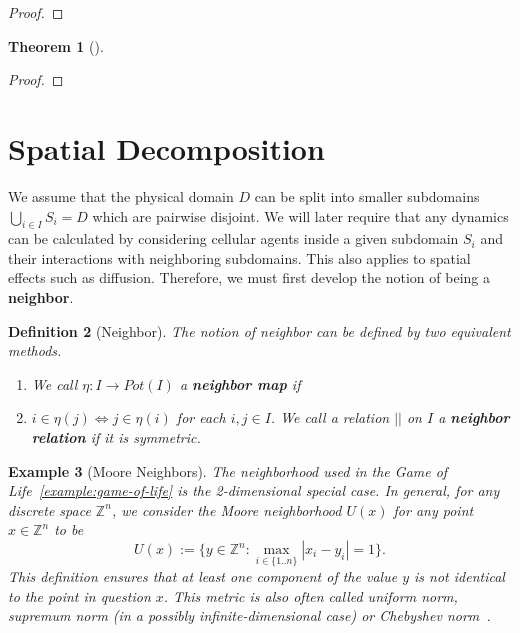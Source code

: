 \documentclass{article}
\newtheorem{definition}{Definition}[section]
\newtheorem{example}[definition]{Example}
\newtheorem{theorem}[definition]{Theorem}
\begin{document}
\begin{proof}
\end{proof}

\begin{theorem}[]
\end{theorem}
\begin{proof}
\end{proof}

\section{Spatial Decomposition}
\label{section:spatial-decomposition}
We assume that the physical domain $D$ can be split into smaller subdomains
$\bigcup_{i\in I}S_i=D$ which are pairwise disjoint.
We will later require that any dynamics can be calculated by considering cellular agents inside a
given subdomain $S_i$ and their interactions with neighboring subdomains.
This also applies to spatial effects such as diffusion.
Therefore, we must first develop the notion of being a \textbf{neighbor}.

\begin{definition}[Neighbor]
    The notion of neighbor can be defined by two equivalent methods.
    \begin{enumerate}
        \item We call $\eta:I\rightarrow Pot(I)$ a \textbf{neighbor map} if
        \item $i\in\eta(j) \Leftrightarrow j\in\eta(i)$ for each $i,j\in I$.
            We call a relation $||$ on $I$ a \textbf{neighbor relation} if it is symmetric.
    \end{enumerate}
\end{definition}

\begin{example}[Moore Neighbors]
    The neighborhood used in the Game of Life~\ref{example:game-of-life} is the 2-dimensional
    special case.
    In general, for any discrete space $\mathbb{Z}^n$, we consider the Moore neighborhood $U(x)$ for
    any point $x\in\mathbb{Z}^n$ to be
    \begin{equation}
        U(x) := \{y\in\mathbb{Z}^n:\max\limits_{i\in\{1..n\}}|x_i-y_i|=1\}.
    \end{equation}
    This definition ensures that at least one component of the value $y$ is not identical to the
    point in question $x$.
    This metric is also often called uniform norm, supremum norm (in a possibly infinite-dimensional
    case) or Chebyshev norm~\cite{Rudin1976}.
\end{example}
\end{document}
